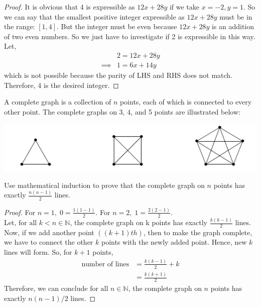 \documentclass[12pt]{article}
\newenvironment{problem}[2][Problem]{\begin{trivlist}
\item[\hskip \labelsep {\bfseries #1}\hskip \labelsep {\bfseries #2.}]}{\end{trivlist}}
\begin{document}
\begin{proof}
	It is obvious that 4 is expressible as $12x + 28y$ if we take $x = -2, y = 1$. So we can say that the smallest positive integer expressible as $12x + 28y$ must be in the range: $[1, 4]$. But the integer must be even because $12x + 28y$ is an addition of two even numbers. So we just have to investigate if 2 is expressible in this way.\\
	Let,
	\begin{align*}
		         & 2 = 12x + 28y \\
		\implies & 1 = 6x + 14y
	\end{align*}
	which is not possible because the parity of LHS and RHS does not match. Therefore, 4 is the desired integer.

\end{proof}

\begin{problem}{10}
A complete graph is a collection of \( n \) points, each of which is connected to every
other point. The complete graphs on 3, 4, and 5 points are illustrated below:\\
\begin{center}
	\includegraphics[width=0.5\linewidth]{image.png}
\end{center}
Use mathematical induction to prove that the complete graph on \( n \) points has exactly $\frac{n(n-1)}{2}$ lines.

\end{problem}

\begin{proof}
	For $n = 1, \; 0 = \frac{1(1-1)}{2}$. For $n = 2, \; 1 = \frac{2(2-1)}{2}$. \\
	Let, $\text{for all } k < n \in \mathbb{N}$, the complete graph on k points has exactly $\frac{k(k-1)}{2}$ lines. \\
	Now, if we add another point $((k+1)th)$, then to make the graph complete, we have to connect the other $k$ points with the newly added point. Hence, new $k$ lines will form.
	So, for $k + 1$ points,
	\begin{align*}
		\text{number of lines} & = \frac{k(k-1)}{2} + k \\
		                       & = \frac{k(k+1)}{2}
	\end{align*}
	Therefore, we can conclude $\text{for all } n \in \mathbb{N}$, the complete graph on $n$ points has exactly $n(n-1)/2$ lines.

\end{proof}
\end{document}
